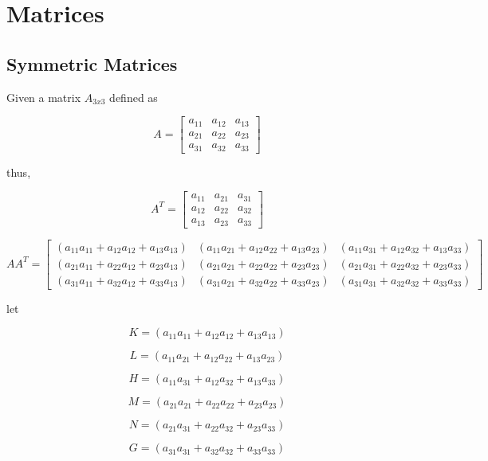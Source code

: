 \chapter{Matrices}

\section{Symmetric Matrices}

Given a matrix $A_{3x3}$ defined as

$$
A = 
\begin{bmatrix}
a_{11} & a_{12} & a_{13}\\
a_{21} & a_{22} & a_{23}\\
a_{31} & a_{32} & a_{33}
\end{bmatrix}
$$

thus,

$$
A^T = 
\begin{bmatrix}
a_{11} & a_{21} & a_{31}\\
a_{12} & a_{22} & a_{32}\\
a_{13} & a_{23} & a_{33}
\end{bmatrix}
$$

\begin{equation}
    AA^T = 
    \begin{bmatrix}
        (a_{11}a_{11} + a_{12}a_{12} + a_{13}a_{13}) & (a_{11}a_{21} + a_{12}a_{22} + a_{13}a_{23}) & (a_{11}a_{31} + a_{12}a_{32} + a_{13}a_{33})\\
        (a_{21}a_{11} + a_{22}a_{12} + a_{23}a_{13}) & (a_{21}a_{21} + a_{22}a_{22} + a_{23}a_{23}) & (a_{21}a_{31} + a_{22}a_{32} + a_{23}a_{33})\\
        (a_{31}a_{11} + a_{32}a_{12} + a_{33}a_{13}) & (a_{31}a_{21} + a_{32}a_{22} + a_{33}a_{23}) & (a_{31}a_{31} + a_{32}a_{32} + a_{33}a_{33})
    \end{bmatrix}    
\end{equation}

let

$$
K = (a_{11}a_{11} + a_{12}a_{12} + a_{13}a_{13})
$$

$$
L = (a_{11}a_{21} + a_{12}a_{22} + a_{13}a_{23})
$$

$$
H = (a_{11}a_{31} + a_{12}a_{32} + a_{13}a_{33})
$$

$$
M = (a_{21}a_{21} + a_{22}a_{22} + a_{23}a_{23})
$$

$$
N = (a_{21}a_{31} + a_{22}a_{32} + a_{23}a_{33})
$$

$$
G = (a_{31}a_{31} + a_{32}a_{32} + a_{33}a_{33})
$$

